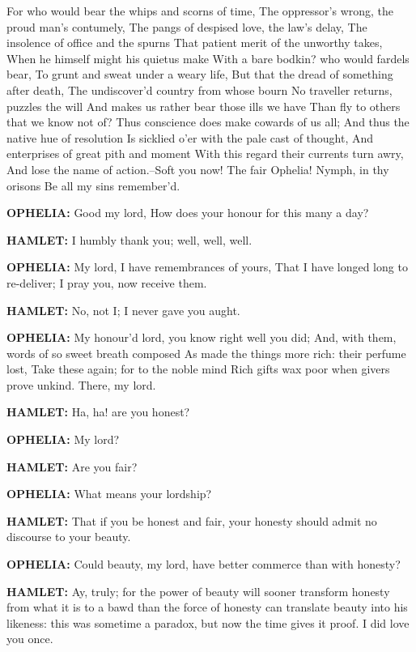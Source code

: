 \documentclass{article}
\begin{document}
    For who would bear the whips and scorns of time,
    The oppressor's wrong, the proud man's contumely,
    The pangs of despised love, the law's delay,
    The insolence of office and the spurns
    That patient merit of the unworthy takes,
    When he himself might his quietus make
    With a bare bodkin? who would fardels bear,
    To grunt and sweat under a weary life,
    But that the dread of something after death,
    The undiscover'd country from whose bourn
    No traveller returns, puzzles the will
    And makes us rather bear those ills we have
    Than fly to others that we know not of?
    Thus conscience does make cowards of us all;
    And thus the native hue of resolution
    Is sicklied o'er with the pale cast of thought,
    And enterprises of great pith and moment
    With this regard their currents turn awry,
    And lose the name of action.--Soft you now!
    The fair Ophelia! Nymph, in thy orisons
    Be all my sins remember'd.

\textbf{OPHELIA:}
    Good my lord,
    How does your honour for this many a day?

\textbf{HAMLET:}
    I humbly thank you; well, well, well.

\textbf{OPHELIA:}
    My lord, I have remembrances of yours,
    That I have longed long to re-deliver;
    I pray you, now receive them.

\textbf{HAMLET:}
    No, not I;
    I never gave you aught.

\textbf{OPHELIA:}
    My honour'd lord, you know right well you did;
    And, with them, words of so sweet breath composed
    As made the things more rich: their perfume lost,
    Take these again; for to the noble mind
    Rich gifts wax poor when givers prove unkind.
    There, my lord.

\textbf{HAMLET:}
    Ha, ha! are you honest?

\textbf{OPHELIA:}
    My lord?

\textbf{HAMLET:}
    Are you fair?

\textbf{OPHELIA:}
    What means your lordship?

\textbf{HAMLET:}
    That if you be honest and fair, your honesty should
    admit no discourse to your beauty.

\textbf{OPHELIA:}
    Could beauty, my lord, have better commerce than
    with honesty?

\textbf{HAMLET:}
    Ay, truly; for the power of beauty will sooner
    transform honesty from what it is to a bawd than the
    force of honesty can translate beauty into his
    likeness: this was sometime a paradox, but now the
    time gives it proof. I did love you once.
\end{document}

